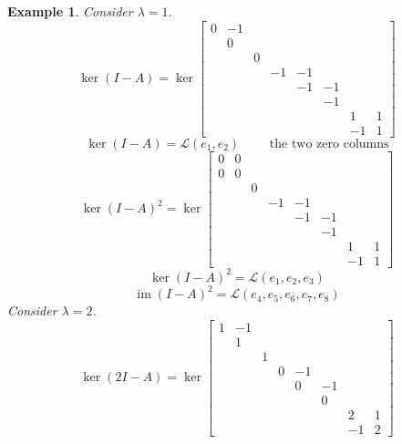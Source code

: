\documentclass{article}
\newcounter{lecref}[section]
\numberwithin{lecref}{section}
\newtheorem{example}[lecref]{Example}
\DeclareMathOperator{\im}{im}
\begin{document}
\begin{example}
  Consider $\lambda = 1$.
  \[
    \ker\left( I - A \right) =
    \ker\begin{bmatrix}
      0 & -1 &   &    &    &    &    & \\
        & 0  &   &    &    &    &    & \\
        &    & 0 &    &    &    &    & \\
        &    &   & -1 & -1 &    &    & \\
        &    &   &    & -1 & -1 &    & \\
        &    &   &    &    & -1 &    & \\
        &    &   &    &    &    & 1  & 1 \\
        &    &   &    &    &    & -1 & 1
    \end{bmatrix}
  \]
  \[ \ker(I - A) = \mathcal L(e_1, e_2) \qquad \text{ the two zero columns} \]
  \[
    \ker(I - A)^2 = \ker\begin{bmatrix}
      0 & 0  &   &    &    &    &    & \\
      0 & 0  &   &    &    &    &    & \\
        &    & 0 &    &    &    &    & \\
        &    &   & -1 & -1 &    &    & \\ %
        &    &   &    & -1 & -1 &    & \\ %
        &    &   &    &    & -1 &    & \\ %
        &    &   &    &    &    & 1  & 1 \\ %
        &    &   &    &    &    & -1 & 1    %
    \end{bmatrix}
  \]
  \[ \ker(I - A)^2 = \mathcal L(e_1, e_2, e_3) \]
  \[ \im(I - A)^2 = \mathcal L(e_4, e_5, e_6, e_7, e_8) \]
  Consider $\lambda = 2$.
  \[
    \ker(2I - A) = \ker\begin{bmatrix}
      1 & -1 &   &    &    &    &    & \\
        & 1  &   &    &    &    &    & \\
        &    & 1 &    &    &    &    & \\
        &    &   & 0  & -1 &    &    & \\
        &    &   &    & 0  & -1 &    & \\
        &    &   &    &    & 0  &    & \\
        &    &   &    &    &    & 2  & 1 \\
        &    &   &    &    &    & -1 & 2
    \end{bmatrix}
  \] \[
\]
\end{example}
\end{document}
